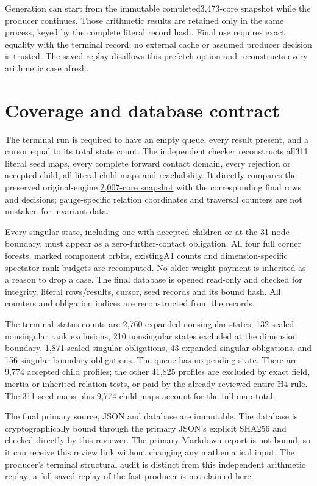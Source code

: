 \documentclass[
  10pt,
]{report}
\begin{document}
Generation can start from the immutable completed3,473-core snapshot
while the producer continues. Those arithmetic results are retained only
in the same process, keyed by the complete literal record hash. Final
use requires exact equality with the terminal record; no external cache
or assumed producer decision is trusted. The saved replay disallows this
prefetch option and reconstructs every arithmetic case afresh.

\section{Coverage and database
contract}\label{coverage-and-database-contract}

The terminal run is required to have an empty queue, every result
present, and a cursor equal to its total state count. The independent
checker reconstructs all311 literal seed maps, every complete forward
contact domain, every rejection or accepted child, all literal child
maps and reachability. It directly compares the preserved
original-engine
\href{../data/enumerations/fresh_sqrt5_nonsingular_rank29_exhaustion_20261015_batch2007.json}{2,007-core
snapshot} with the corresponding final rows and decisions;
gauge-specific relation coordinates and traversal counters are not
mistaken for invariant data.

Every singular state, including one with accepted children or at the
31-node boundary, must appear as a zero-further-contact obligation. All
four full corner forests, marked component orbits, existingA1 counts and
dimension-specific spectator rank budgets are recomputed. No older
weight payment is inherited as a reason to drop a case. The final
database is opened read-only and checked for integrity, literal
rows/results, cursor, seed records and its bound hash. All counters and
obligation indices are reconstructed from the records.

The terminal status counts are 2,760 expanded nonsingular states, 132
sealed nonsingular rank exclusions, 210 nonsingular states excluded at
the dimension boundary, 1,871 sealed singular obligations, 43 expanded
singular obligations, and 156 singular boundary obligations. The queue
has no pending state. There are 9,774 accepted child profiles; the other
41,825 profiles are excluded by exact field, inertia or
inherited-relation tests, or paid by the already reviewed entire-H4
rule. The 311 seed maps plus 9,774 child maps account for the full map
total.

The final primary source, JSON and database are immutable. The database
is cryptographically bound through the primary JSON's explicit SHA256
and checked directly by this reviewer. The primary Markdown report is
not bound, so it can receive this review link without changing any
mathematical input. The producer's terminal structural audit is distinct
from this independent arithmetic replay; a full saved replay of the fast
producer is not claimed here.
\end{document}
